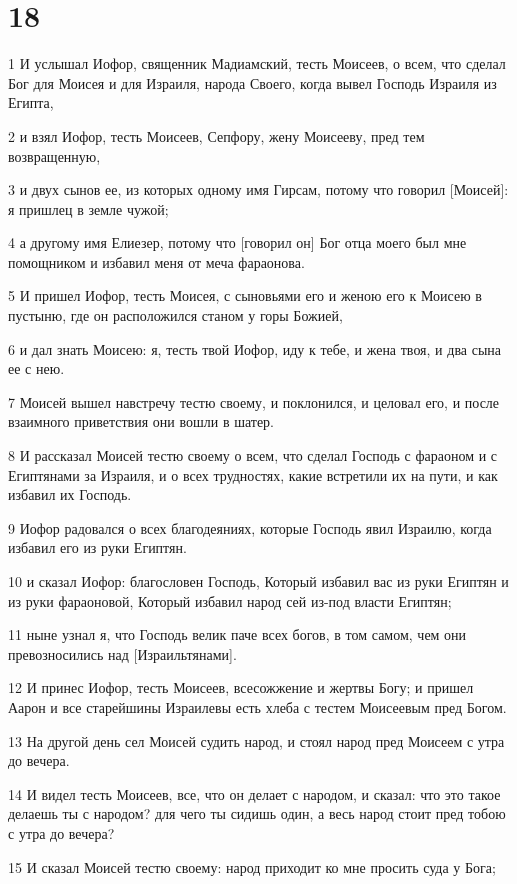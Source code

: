 \chapter{18}

\par 1 И услышал Иофор, священник Мадиамский, тесть Моисеев, о всем, что сделал Бог для Моисея и для Израиля, народа Своего, когда вывел Господь Израиля из Египта,
\par 2 и взял Иофор, тесть Моисеев, Сепфору, жену Моисееву, пред тем возвращенную,
\par 3 и двух сынов ее, из которых одному имя Гирсам, потому что говорил [Моисей]: я пришлец в земле чужой;
\par 4 а другому имя Елиезер, потому что [говорил он] Бог отца моего был мне помощником и избавил меня от меча фараонова.
\par 5 И пришел Иофор, тесть Моисея, с сыновьями его и женою его к Моисею в пустыню, где он расположился станом у горы Божией,
\par 6 и дал знать Моисею: я, тесть твой Иофор, иду к тебе, и жена твоя, и два сына ее с нею.
\par 7 Моисей вышел навстречу тестю своему, и поклонился, и целовал его, и после взаимного приветствия они вошли в шатер.
\par 8 И рассказал Моисей тестю своему о всем, что сделал Господь с фараоном и с Египтянами за Израиля, и о всех трудностях, какие встретили их на пути, и как избавил их Господь.
\par 9 Иофор радовался о всех благодеяниях, которые Господь явил Израилю, когда избавил его из руки Египтян.
\par 10 и сказал Иофор: благословен Господь, Который избавил вас из руки Египтян и из руки фараоновой, Который избавил народ сей из-под власти Египтян;
\par 11 ныне узнал я, что Господь велик паче всех богов, в том самом, чем они превозносились над [Израильтянами].
\par 12 И принес Иофор, тесть Моисеев, всесожжение и жертвы Богу; и пришел Аарон и все старейшины Израилевы есть хлеба с тестем Моисеевым пред Богом.
\par 13 На другой день сел Моисей судить народ, и стоял народ пред Моисеем с утра до вечера.
\par 14 И видел тесть Моисеев, все, что он делает с народом, и сказал: что это такое делаешь ты с народом? для чего ты сидишь один, а весь народ стоит пред тобою с утра до вечера?
\par 15 И сказал Моисей тестю своему: народ приходит ко мне просить суда у Бога;
